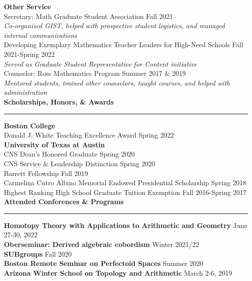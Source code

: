 \documentclass[11pt]{article}
\newenvironment{mysection}{
\color{mygreen}\bfseries\large
}
{
\\ \rule{\textwidth}{1pt}\hspace{-.25em}
} %
\begin{document}
\textbf{Other Service} \\
Secretary: Math Graduate Student Association \hfill Fall 2021-- \\
\textit{Co-organized GIST, helped with prospective student logistics, and managed internal communications} \\
Developing Exemplary Mathematics Teacher Leaders for High-Need Schools \hfill Fall 2021-Spring 2022\\
\textit{Served as Graduate Student Representative for Content initiative} \\
Counselor: Ross Mathematics Program \hfill Summer 2017 \& 2019 \\
\textit{Mentored students, trained other counselors, taught courses, and helped with administration} \\

\begin{mysection}Scholarships, Honors, \& Awards\end{mysection}
\textbf{Boston College} \\
Donald J. White Teaching Excellence Award \hfill Spring 2022 \\

\textbf{University of Texas at Austin} \\
CNS Dean's Honored Graduate \hfill Spring 2020 \\
CNS Service \& Leadership Distinction \hfill Spring 2020 \\
Barrett Fellowship \hfill Fall 2019 \\
Carmelina Cutro Albino Memorial Endowed Presidential Scholarship \hfill Spring 2018 \\
Highest Ranking High School Graduate Tuition Exemption \hfill Fall 2016-Spring 2017 \\

\begin{mysection}Attended Conferences \& Programs\end{mysection}
\textbf{Homotopy Theory with Applications to Arithmetic and Geometry} \hfill June 27-30, 2022 \\
\textbf{Oberseminar: Derived algebraic cobordism} \hfill Winter 2021/22 \\
\textbf{SUBgroups} \hfill Fall 2020 \\
\textbf{Boston Remote Seminar on Perfectoid Spaces} \hfill Summer 2020 \\
\textbf{Arizona Winter School on Topology and Arithmetic} \hfill March 2-6, 2019 \\
\end{document}
